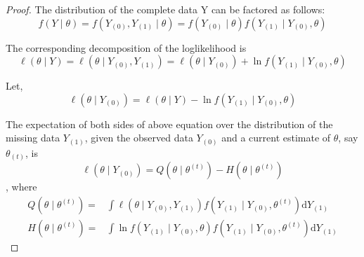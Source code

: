 \begin{proof}
    The distribution of the complete data Y can be factored as follows:
    \begin{equation}
        f(Y \mid \theta)=f\left(Y_{(0)}, Y_{(1)} \mid \theta\right)=f\left(Y_{(0)} \mid \theta\right) f\left(Y_{(1)} \mid Y_{(0)}, \theta\right)
    \end{equation}

    The corresponding decomposition of the loglikelihood is
    \begin{equation}
        \ell(\theta \mid Y)=\ell\left(\theta \mid Y_{(0)}, Y_{(1)}\right)=\ell\left(\theta \mid Y_{(0)}\right)+\ln f\left(Y_{(1)} \mid Y_{(0)}, \theta\right)
    \end{equation}

    Let,
    \begin{equation}
        \ell\left(\theta \mid Y_{(0)}\right)=\ell(\theta \mid Y)-\ln f\left(Y_{(1)} \mid Y_{(0)}, \theta\right)
    \end{equation}

    The expectation of both sides of above equation over the distribution of the missing data $Y_{(1)}$, given the observed data $Y_{(0)}$ and a current estimate of $\theta$, say $\theta_{(t)}$, is
    \begin{equation}
        \ell\left(\theta \mid Y_{(0)}\right)=Q\left(\theta \mid \theta^{(t)}\right)-H\left(\theta \mid \theta^{(t)}\right)
    \end{equation}
    , where
    \begin{equation}
        \begin{aligned}
            Q\left(\theta \mid \theta^{(t)}\right)= & \int\ell\left(\theta \mid Y_{(0)}, Y_{(1)}\right) f\left(Y_{(1)} \mid Y_{(0)}, \theta^{(t)}\right) \mathrm{d} Y_{(1)} \\
            H\left(\theta\mid\theta^{(t)}\right)=   & \int\ln f\left(Y_{(1)}\mid Y_{(0)},\theta\right)f\left(Y_{(1)} \mid Y_{(0)}, \theta^{(t)}\right) \mathrm{d} Y_{(1)}
        \end{aligned}
    \end{equation}


\end{proof}
